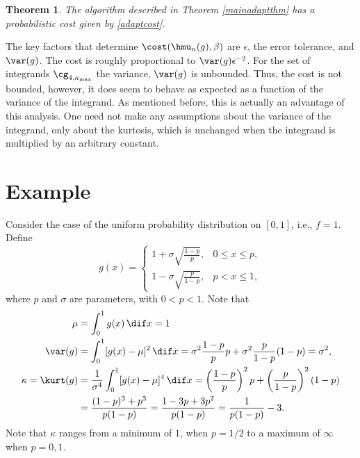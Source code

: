 \documentclass[12pt]{amsart}
\newtheorem{theorem}{Theorem}
\begin{document}
\begin{theorem} \label{costtheorem} The algorithm described in Theorem \ref{mainadaptthm} has a probabilistic cost given by \eqref{adaptcost}.
\end{theorem}

The key factors that determine $\cost(\hmu_n(g),\beta)$ are $\epsilon$, the error tolerance, and $\var(g)$.  The cost is roughly proportional to $\var(g)\epsilon^{-2}$.  For the set of integrands $\cg_{4,\kappa_{\max}}$ the variance, $\var(g)$ is unbounded.  Thus, the cost is not bounded, however, it does seem to behave as expected as a function of the variance of the integrand.  As mentioned before, this is actually an advantage of this analysis.  One need not make any assumptions about the variance of the integrand, only about the kurtosis, which is unchanged when the integrand is multiplied by an arbitrary constant.


\section{Example}

Consider the case of the uniform probability distribution on $[0,1]$, i.e., $f=1$.  Define
\begin{equation} \label{exampleeq}
g(x) = \begin{cases} 1 + \sigma \sqrt{\frac{1-p}{p}}, & 0 \le x \le p,\\
1 - \sigma \sqrt{\frac{p}{1-p}}, & p < x \le 1,
\end{cases}
\end{equation}
where $p$ and $\sigma$ are parameters, with $0 < p < 1$.
Note that
\begin{align*}
\mu &= \int_0^1 g(x) \, \dif x = 1\\
\var(g) &= \int_0^1 [g(x)-\mu]^2 \, \dif x = \sigma^2 \frac{1-p}{p} p + \sigma^2 \frac{p}{1-p} (1-p) = \sigma^2, \\
\kappa = \kurt(g) &= \frac{1}{\sigma^4}\int_0^1 [g(x)-\mu]^4 \, \dif x = \left(\frac{1-p}{p}\right)^2 p + \left(\frac{p}{1-p} \right)^2 (1-p) \\
& = \frac{(1-p)^3 + p^3}{p(1-p)} = \frac{1-3p+3p^2}{p(1-p)} = \frac{1}{p(1-p)} - 3.
\end{align*}
Note that $\kappa$ ranges from a minimum of $1$, when $p=1/2$ to a maximum of $\infty$ when $p=0,1$.
\end{document}
